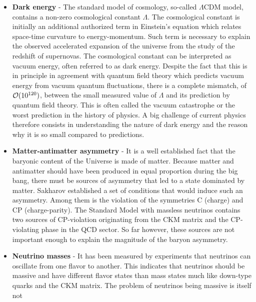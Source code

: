     \begin{itemize}
        \item \textbf{Dark energy} - The standard model of cosmology, so-called $\Lambda$CDM model,
            contains a non-zero cosmological constant $\Lambda$. The cosmological
            constant is initially an additional authorized term in Einstein's equation
            which relates space-time curvature to energy-momentum. Such term is necessary
            to explain the observed accelerated expansion of the universe from the study
            of the redshift of supernovas. The cosmological constant can be interpreted
            as vacuum energy, often referred to as dark energy. Despite the fact that this
            is in principle in agreement with quantum field theory which predicts vacuum
            energy from vacuum quantum fluctuations, there is a complete mismatch, of $\mathcal{O}(10^{120})$,
            between the small measured value of $\Lambda$ and its prediction
            by quantum field theory. This is often called the vacuum catastrophe or the worst
            prediction in the history of physics. A big challenge of current physics therefore
            consists in understanding the nature of dark energy and the reason why it is so small
            compared to predictions.
        \item \textbf{Matter-antimatter asymmetry} - It is a well established fact that
            the baryonic content of the Universe is made of matter. Because matter and antimatter
            should have been produced in equal proportion during the big bang, there must
            be sources of asymmetry that led to a state dominated by matter. Sakharov
            established a set of conditions that would
            induce such an asymmetry. Among them is the violation of the symmetries C (charge)
            and CP (charge-parity). The Standard Model
            with massless neutrinos contains two sources of CP-violation originating from
            the CKM matrix and the CP-violating phase in the QCD sector. So far however,
            these sources are not important enough to explain the magnitude of the baryon
            asymmetry.
        \item \textbf{Neutrino masses} - It has been measured by experiments that neutrinos
            can oscillate from one flavor to another. This indicates that neutrinos should
            be massive and have different flavor states than mass states much like down-type
            quarks and the CKM matrix. The problem of neutrinos being massive is itself not

\end{itemize}
